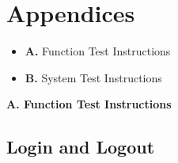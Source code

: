 \documentclass{article}
\begin{document}
\section{Appendices}
	\begin{itemize}
		\item \textbf{A.} Function Test Instructions 
		\item \textbf{B.} System Test Instructions  	
	\end{itemize}


\newpage
\begin{flushleft}
{\large \textbf{A. Function Test Instructions}}
\end{flushleft}
		
\subsection{Login and Logout}
\end{document}
